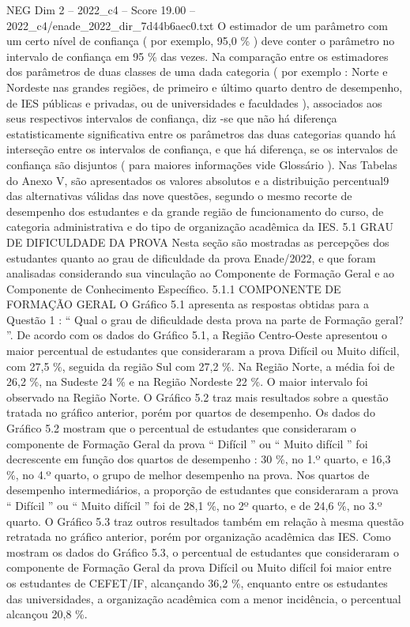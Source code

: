 \begin{textsample}{NEG Dim 2 – 2022\_c4 – Score 19.00 – 2022\_c4/enade\_2022\_dir\_7d44b6aec0.txt}
O estimador de um parâmetro com um certo nível de confiança ( por exemplo, 95,0 \% ) deve conter o parâmetro no intervalo de confiança em 95 \% das vezes.
Na comparação entre os estimadores dos parâmetros de duas classes de uma dada categoria ( por exemplo : Norte e Nordeste nas grandes regiões, de primeiro e último quarto dentro de desempenho, de IES públicas e privadas, ou de universidades e faculdades ), associados aos seus respectivos intervalos de confiança, diz -se que não há diferença estatisticamente significativa entre os parâmetros das duas categorias quando há interseção entre os intervalos de confiança, e que há diferença, se os intervalos de confiança são disjuntos ( para maiores informações vide Glossário ).
Nas Tabelas do Anexo V, são apresentados os valores absolutos e a distribuição percentual9 das alternativas válidas das nove questões, segundo o mesmo recorte de desempenho dos estudantes e da grande região de funcionamento do curso, de categoria administrativa e do tipo de organização acadêmica da IES. 5.1 GRAU DE DIFICULDADE DA PROVA Nesta seção são mostradas as percepções dos estudantes quanto ao grau de dificuldade da prova Enade/2022, e que foram analisadas considerando sua vinculação ao Componente de Formação Geral e ao Componente de Conhecimento Específico. 5.1.1 COMPONENTE DE FORMAÇÃO GERAL O Gráfico 5.1 apresenta as respostas obtidas para a Questão 1 : “ Qual o grau de dificuldade desta prova na parte de Formação geral? ”.
De acordo com os dados do Gráfico 5.1, a Região Centro-Oeste apresentou o maior percentual de estudantes que consideraram a prova Difícil ou Muito difícil, com 27,5 \%, seguida da região Sul com 27,2 \%.
Na Região Norte, a média foi de 26,2 \%, na Sudeste 24 \% e na Região Nordeste 22 \%.
O maior intervalo foi observado na Região Norte.
O Gráfico 5.2 traz mais resultados sobre a questão tratada no gráfico anterior, porém por quartos de desempenho.
Os dados do Gráfico 5.2 mostram que o percentual de estudantes que consideraram o componente de Formação Geral da prova “ Difícil ” ou “ Muito difícil ” foi decrescente em função dos quartos de desempenho : 30 \%, no 1.º quarto, e 16,3 \%, no 4.º quarto, o grupo de melhor desempenho na prova.
Nos quartos de desempenho intermediários, a proporção de estudantes que consideraram a prova “ Difícil ” ou “ Muito difícil ” foi de 28,1 \%, no 2º quarto, e de 24,6 \%, no 3.º quarto.
O Gráfico 5.3 traz outros resultados também em relação à mesma questão retratada no gráfico anterior, porém por organização acadêmica das IES.
Como mostram os dados do Gráfico 5.3, o percentual de estudantes que consideraram o componente de Formação Geral da prova Difícil ou Muito difícil foi maior entre os estudantes de CEFET/IF, alcançando 36,2 \%, enquanto entre os estudantes das universidades, a organização acadêmica com a menor incidência, o percentual alcançou 20,8 \%.

\end{textsample}
